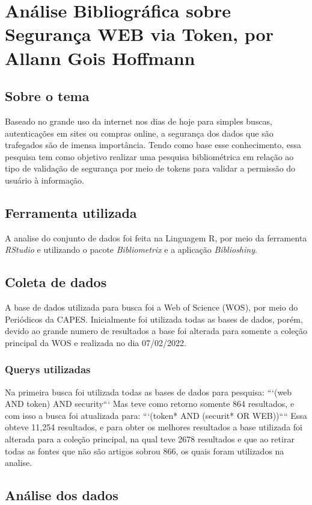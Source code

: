 
\chapter{Análise Bibliográfica sobre Segurança WEB via Token, por Allann Gois Hoffmann\label{chap:bibliometria:AllannH}}

\section{Sobre o tema}
Baseado no grande uso da internet nos dias de hoje para simples buscas, autenticações em sites ou compras online, a segurança dos dados que são trafegados são de imensa importância. Tendo como base esse conhecimento, essa pesquisa tem como objetivo realizar uma pesquisa bibliométrica em relação ao tipo de validação de segurança por meio de tokens para validar a permissão do usuário à informação.

\section{Ferramenta utilizada}
A analise do conjunto de dados foi feita na Linguagem R, por meio da ferramenta \textit{RStudio} e utilizando o pacote \textit{Bibliometrix} e a aplicação \textit{Biblioshiny}.

\section{Coleta de dados} 
A base de dados utilizada para busca foi a Web of Science (WOS), por meio do Periódicos da CAPES. Inicialmente foi utilizada todas as bases de dados, porém, devido ao grande numero de resultados a base foi alterada para somente a coleção principal da WOS e realizada no dia 07/02/2022.

\subsection{Querys utilizadas}
Na primeira busca foi utilizada todas as bases de dados para pesquisa:
```(web AND token) AND security```
Mas teve como retorno somente 864 resultados, e com isso a busca foi atualizada para:
```(token* AND (securit* OR WEB))````
Essa obteve 11,254 resultados, e para obter os melhores resultados a base utilizada foi alterada para a coleção principal, na qual teve 2678 resultados e que ao retirar todas as fontes que não são artigos sobrou 866, os quais foram utilizados na analise.

\section{Análise dos dados}

